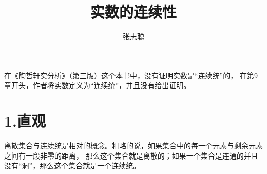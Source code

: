\documentclass{article}
\begin{document}
\title{实数的连续性}
\author{张志聪}
\maketitle

\begin{zremark}
    在《陶哲轩实分析》（第三版）这个本书中，没有证明实数是“连续统”的，
    在第9章开头，作者将实数定义为“连续统”，并且没有给出证明。
\end{zremark}

\section*{1.直观}

离散集合与连续统是相对的概念。粗略的说，如果集合中的每一个元素与剩余元素之间有一段非零的距离，
那么这个集合就是离散的；如果一个集合是连通的并且没有“洞”，那么这个集合就是一个连续统。
\end{document}
